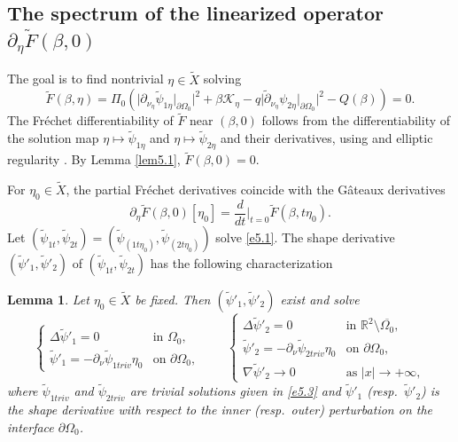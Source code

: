 \documentclass[reqno]{amsart}
\numberwithin{equation}{section}
\newtheorem{lemma}[theorem]{Lemma}
\numberwithin{equation}{section}
\numberwithin{equation}{section}
\begin{document}
\subsection{The spectrum of the linearized operator \(\partial_{\eta}\widetilde{F}(\beta,0)\)}

The goal is to find nontrivial \(\eta \in \widetilde{X}\) solving
$$
\widetilde{F}(\beta,\eta) = \Pi_0\left(\big| \partial_{\nu_\eta} \widetilde{\psi}_{1\eta}\big|_{\partial \Omega_0}\big|^2+\beta\mathcal{K}_{\eta}-q\big| \widetilde{\partial}_{\nu_\eta} \psi_{2\eta}\big|_{\partial \Omega_0}\big|^2-Q(\beta)\right)=0.
$$
The Fr\'{e}chet differentiability of \(\widetilde{F}\) near \((\beta,0)\) follows from the differentiability of the solution map \(\eta \mapsto \widetilde{\psi}_{1\eta}\) and \(\eta \mapsto \widetilde{\psi}_{2\eta}\) and their derivatives, using \cite[Theorem 5.3.2]{HenrotP} and elliptic regularity \cite{Gilbarg}. By Lemma \ref{lem5.1}, \(\widetilde{F}(\beta,0) = 0\).

For \(\eta_0 \in \widetilde{X}\), the partial Fr\'{e}chet derivatives coincide with the G\^{a}teaux derivatives
\[
\partial_\eta \widetilde{F}(\beta,0)[\eta_0] = \frac{d}{dt}\Big|_{t=0} \widetilde{F}(\beta,t\eta_0).
\]
Let \((\widetilde{\psi}_{1t},\widetilde{\psi}_{2t}) = (\widetilde{\psi}_{(1t\eta_0)},\widetilde{\psi}_{(2t\eta_0)})\) solve \eqref{e5.1}. The shape derivative \((\widetilde{\psi}'_1,\widetilde{\psi}'_2)\) of \((\widetilde{\psi}_{1t},\widetilde{\psi}_{2t}) \) has the following characterization

\begin{lemma}\label{lem5.2}
Let \(\eta_0 \in \widetilde{X}\) be fixed. Then \((\widetilde{\psi}'_1,\widetilde{\psi}'_2)\) exist and solve
\begin{equation}\label{e5.5}
\begin{cases}
\Delta \widetilde{\psi}'_{1} = 0 & \text{in } \Omega_0, \\
\widetilde{\psi}'_{1} = -\partial_{\nu}\widetilde{\psi}_{1triv} \eta_0 & \text{on } \partial \Omega_0,
\end{cases}
\qquad
\begin{cases}
\Delta \widetilde{\psi}'_{2} = 0 & \text{in } \mathbb{R}^2 \setminus \overline{\Omega_0}, \\
\widetilde{\psi}'_{2} = -\partial_{\nu}\widetilde{\psi}_{2triv} \eta_0 & \text{on } \partial \Omega_0, \\
\nabla\widetilde{\psi}'_{2} \rightarrow0 & \text{as } |x|\rightarrow +\infty,
\end{cases}
\end{equation}
where $\widetilde{\psi}_{1triv}$ and $\widetilde{\psi}_{2triv}$ are trivial solutions given in \eqref{e5.3} and \(\widetilde{\psi}'_{1}\) (resp.\ \(\widetilde{\psi}'_{2}\)) is the shape derivative with respect to the inner (resp.\ outer) perturbation on the interface $\partial\Omega_0$.
\end{lemma}
\end{document}
